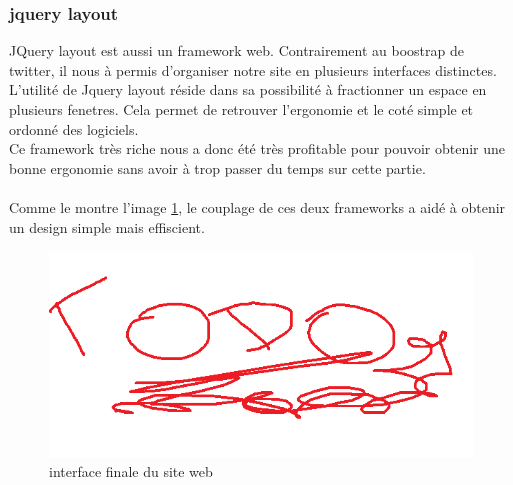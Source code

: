 \subsubsection{jquery layout}

JQuery layout est aussi un framework web. Contrairement au boostrap de twitter, il nous à permis d'organiser
notre site en plusieurs interfaces distinctes. 
\\
L'utilité de Jquery layout réside dans sa possibilité à fractionner un espace en plusieurs fenetres. Cela permet
de retrouver l'ergonomie et le coté simple et ordonné des logiciels. 
\\
Ce framework très riche nous a donc été très profitable pour pouvoir obtenir une bonne ergonomie sans avoir
à trop passer du temps sur cette partie.
\\\\

Comme le montre l'image \ref{design-final}, le couplage de ces deux frameworks a aidé à obtenir un design simple
mais effiscient. 

\begin{figure}[!h]
	\center
	\includegraphics[width=13cm]{img/design-final.png}
	\caption{interface finale du site web}
	\label{design-final}
\end{figure}



